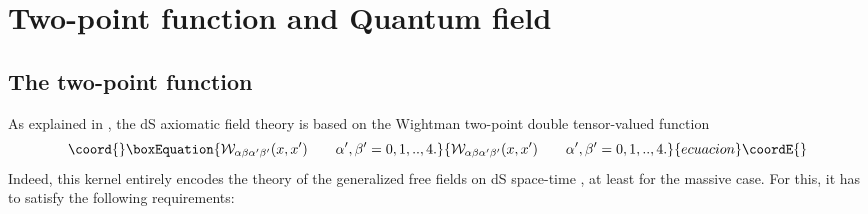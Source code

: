 \documentclass[a4paper,11pt,showpacs,preprintnumbers]{revtex4}
\begin{document}
\section{Two-point function and Quantum field }
\subsection{The two-point function}

As explained in \cite{brmo}, the dS axiomatic field theory is
based on the Wightman two-point double tensor-valued function
\begin{equation}\coord{}\boxEquation{
{\cal W}_{\alpha\beta\alpha'\beta'}(x,x')\qquad
\alpha',\beta'=0,1,..,4. \label{eq:def}
}{
{\cal W}_{\alpha\beta\alpha'\beta'}(x,x')\qquad
\alpha',\beta'=0,1,..,4. }{ecuacion}\coordE{}\end{equation}
Indeed, this kernel entirely encodes the theory of the generalized
free fields on dS space-time \coordHE{}, at least for the massive case.
For this, it has to satisfy the following requirements:
\end{document}
